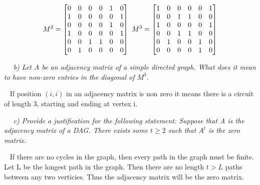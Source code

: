 \documentclass[12pt, letterpaper]{article}
\begin{document}
\[ M^2 = \begin{bmatrix}
  0 & 0 & 0 & 0 & 1 & 0 \\
  1 & 0 & 0 & 0 & 0 & 1 \\
  0 & 0 & 0 & 0 & 1 & 0 \\
  1 & 0 & 0 & 0 & 0 & 1 \\
  0 & 0 & 1 & 1 & 0 & 0 \\
  0 & 1 & 0 & 0 & 0 & 0
\end{bmatrix} \textnormal{  }
M^3 = \begin{bmatrix}
  1 & 0 & 0 & 0 & 0 & 1 \\
  0 & 0 & 1 & 1 & 0 & 0 \\
  1 & 0 & 0 & 0 & 0 & 1 \\
  0 & 0 & 1 & 1 & 0 & 0 \\
  0 & 1 & 0 & 0 & 1 & 0 \\
  0 & 0 & 0 & 0 & 1 & 0
\end{bmatrix}
\]

\-\ \newline
\-\ \it{b) Let A be an adjacency matrix of a simple directed graph. What does it mean to have non-zero entries in the diagonal of \(M^3\).}

\-\ \newline
\textnormal{If position \((i, i)\) in an adjacency matrix is non zero it means there is a circuit of length 3, starting and ending at vertex i. }


\-\ \newline
\-\ \it{c) Provide a justification for the following statement: Suppose that A is the adjacency matrix of a DAG. There exists some \(t \ge 2\) such that \(A^t\) is the zero matrix. }

\-\ \newline
\textnormal{ If there are no cycles in the graph, then every path in the graph must be finite. Let L be the longest path in the graph. Then there are no length \(t > L\) paths between any two verticies. Thus the adjacency matrix will be the zero matrix.  }
\end{document}
